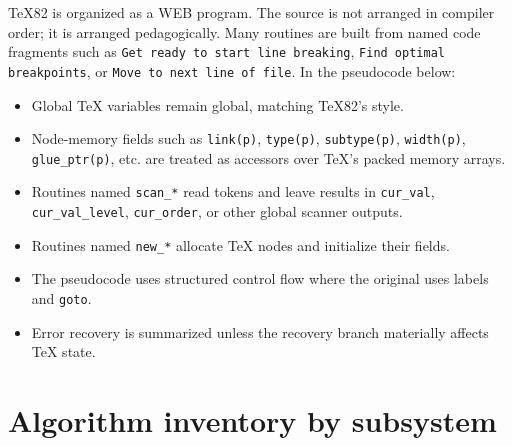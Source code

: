 \documentclass[11pt]{article}
\providecommand{\tightlist}{\setlength{\itemsep}{0pt}\setlength{\parskip}{0pt}}
\begin{document}
TeX82 is organized as a WEB program. The source is not arranged in
compiler order; it is arranged pedagogically. Many routines are built
from named code fragments such as
\texttt{Get ready to start line breaking},
\texttt{Find optimal breakpoints}, or
\texttt{Move to next line of file}. In the pseudocode
below:

\begin{itemize}
\tightlist
\item
  Global TeX variables remain global, matching TeX82's style.
\item
  Node-memory fields such as \texttt{link(p)},
  \texttt{type(p)},
  \texttt{subtype(p)},
  \texttt{width(p)},
  \texttt{glue\_ptr(p)}, etc. are treated as accessors
  over TeX's packed memory arrays.
\item
  Routines named \texttt{scan\_*} read tokens and leave
  results in \texttt{cur\_val},
  \texttt{cur\_val\_level},
  \texttt{cur\_order}, or other global scanner outputs.
\item
  Routines named \texttt{new\_*} allocate TeX nodes and
  initialize their fields.
\item
  The pseudocode uses structured control flow where the original uses
  labels and \texttt{goto}.
\item
  Error recovery is summarized unless the recovery branch materially
  affects TeX state.
\end{itemize}

\section{Algorithm inventory by
subsystem}\label{algorithm-inventory-by-subsystem}
\end{document}
